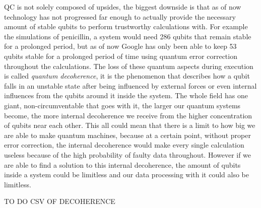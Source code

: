 QC is not solely composed of upsides, the biggest downside is that as of now technology has not progressed far enough to actually provide the necessary amount of stable qubits to perform trustworthy calculations with. For example the simulations of penicillin, a system would need 286 qubits that remain stable for a prolonged period, but as of now  Google has only been able to keep 53 qubits stable for a prolonged period of time using quantum error correction throughout the calculations. The loss of these quantum aspects during execution is called \textit{quantum decoherence}, it is the phenomenon that describes how a qubit falls in an unstable state after being influenced by external forces or even internal influences from the qubits around it inside the system. The whole field has one giant, non-circumventable that goes with it, the larger our quantum systems become, the more internal decoherence we receive from the higher concentration of qubits near each other. This all could mean that there is a limit to how big we are able to make quantum machines, because at a certain point, without proper error correction, the internal decoherence would make every single calculation useless because of the high probability of faulty data throughout. However if we are able to find a solution to this internal decoherence, the amount of qubits inside a system could be limitless and our data processing with it could also be limitless.

TO DO CSV OF DECOHERENCE



